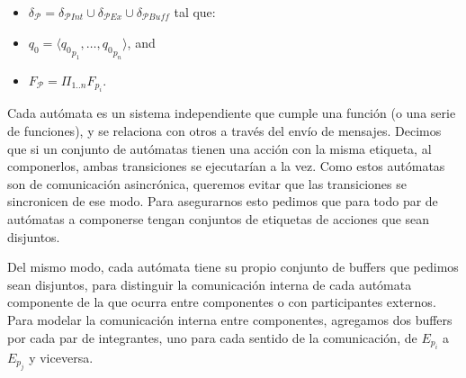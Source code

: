 \begin{definition}
\begin{itemize}
\item $\delta_{\mathcal{P}} = \delta_{\mathcal{P}\mathit{Int}} \cup \delta_{\mathcal{P}\mathit{Ex}} \cup \delta_{\mathcal{P}\mathit{Buff}}$ tal que:
\item $q_0 = \langle {q_0}_{p_1}, \ldots, {q_0}_{p_n} \rangle$, and
\item $F_{\mathcal{P}} = \Pi_{1..n} F_{p_i}$.
\end{itemize}

Cada autómata es un sistema independiente que cumple una función (o una serie de funciones), y se relaciona con otros a través del envío de mensajes. Decimos que si un conjunto de autómatas tienen una acción con la misma etiqueta, al componerlos, ambas transiciones se ejecutarían a la vez. Como estos autómatas son de comunicación asincrónica, queremos evitar que las transiciones se sincronicen de ese modo. Para asegurarnos esto pedimos que para todo par de autómatas a componerse tengan conjuntos de etiquetas de acciones que sean disjuntos. 

Del mismo modo, cada autómata tiene su propio conjunto de buffers que pedimos sean disjuntos, para distinguir la comunicación interna de cada autómata componente de la que ocurra entre componentes o con participantes externos. Para modelar la comunicación interna entre componentes, agregamos dos buffers por cada par de integrantes, uno para cada sentido de la comunicación, de $E_{p_i}$ a $E_{p_j}$ y viceversa.


\end{definition}
